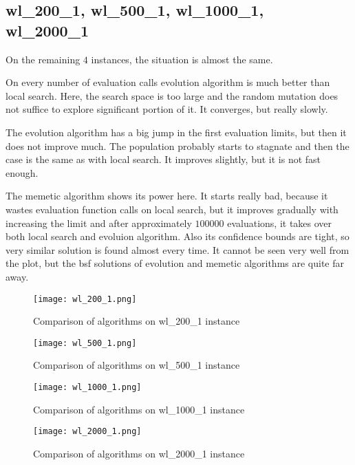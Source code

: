 \documentclass[./main.tex]{subfiles}
\begin{document}
\newpage
\subsection{wl\_200\_1, wl\_500\_1, wl\_1000\_1, wl\_2000\_1}
On the remaining $4$ instances, the situation is almost the same.

On every number of evaluation calls evolution algorithm is much better than local search.
Here, the search space is too large and the random mutation does not suffice to explore significant portion of it.
It converges, but really slowly.

The evolution algorithm has a big jump in the first evaluation limits, but then it does not improve much.
The population probably starts to stagnate and then the case is the same as with local search.
It improves slightly, but it is not fast enough.

The memetic algorithm shows its power here.
It starts really bad, because it wastes evaluation function calls on local search, but it improves gradually with increasing the limit and after approximately $100 000$ evaluations, it takes over both local search and evoluion algorithm.
Also its confidence bounds are tight, so very similar solution is found almost every time.
It cannot be seen very well from the plot, but the bsf solutions of evolution and memetic algorithms are quite far away.
\begin{figure}
    \centering
    \texttt{[image: wl\_200\_1.png]}
    \caption{Comparison of algorithms on wl\_200\_1 instance}
\end{figure}
\begin{figure}
    \centering
    \texttt{[image: wl\_500\_1.png]}
    \caption{Comparison of algorithms on wl\_500\_1 instance}
\end{figure}
\begin{figure}
    \centering
    \texttt{[image: wl\_1000\_1.png]}
    \caption{Comparison of algorithms on wl\_1000\_1 instance}
\end{figure}
\begin{figure}
    \centering
    \texttt{[image: wl\_2000\_1.png]}
    \caption{Comparison of algorithms on wl\_2000\_1 instance}
\end{figure}
\end{document}
